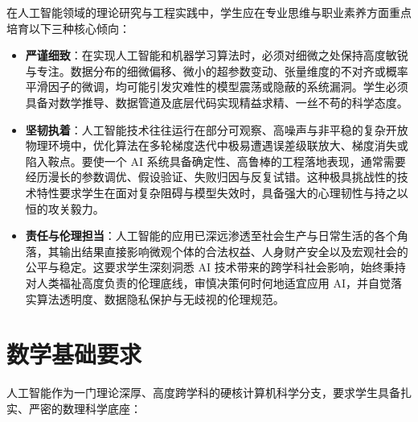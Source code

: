 在人工智能领域的理论研究与工程实践中，学生应在专业思维与职业素养方面重点培育以下三种核心倾向：

\begin{itemize}
    \item \textbf{严谨细致}：在实现人工智能和机器学习算法时，必须对细微之处保持高度敏锐与专注。数据分布的细微偏移、微小的超参数变动、张量维度的不对齐或概率平滑因子的微调，均可能引发灾难性的模型震荡或隐蔽的系统漏洞。学生必须具备对数学推导、数据管道及底层代码实现精益求精、一丝不苟的科学态度。
    \item \textbf{坚韧执着}：人工智能技术往往运行在部分可观察、高噪声与非平稳的复杂开放物理环境中，优化算法在多轮梯度迭代中极易遭遇误差级联放大、梯度消失或陷入鞍点。要使一个 AI 系统具备确定性、高鲁棒的工程落地表现，通常需要经历漫长的参数调优、假设验证、失败归因与反复试错。这种极具挑战性的技术特性要求学生在面对复杂阻碍与模型失效时，具备强大的心理韧性与持之以恒的攻关毅力。
    \item \textbf{责任与伦理担当}：人工智能的应用已深远渗透至社会生产与日常生活的各个角落，其输出结果直接影响微观个体的合法权益、人身财产安全以及宏观社会的公平与稳定。这要求学生深刻洞悉 AI 技术带来的跨学科社会影响，始终秉持对人类福祉高度负责的伦理底线，审慎决策何时何地适宜应用 AI，并自觉落实算法透明度、数据隐私保护与无歧视的伦理规范。
\end{itemize}

\section{数学基础要求}

人工智能作为一门理论深厚、高度跨学科的硬核计算机科学分支，要求学生具备扎实、严密的数理科学底座：

